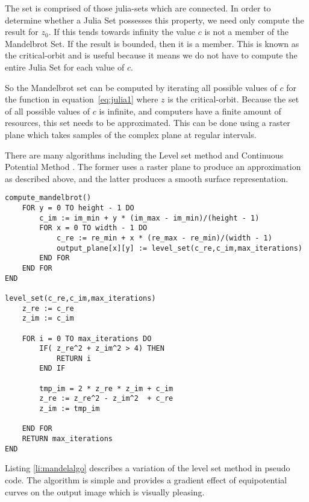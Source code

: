 The set is comprised of those \glspl{julia-set} which are connected. In order to determine whether a Julia Set possesses this property,
we need only compute the result for \(z_0\). If this tends towards infinity the value \(c\) is not a member of the Mandelbrot Set. If the result
is bounded, then it is a member. This is known as the \gls{critical-orbit} and is useful because it means we do not have to compute
the entire Julia Set for each value of \(c\).

So the Mandelbrot set can be computed by iterating all possible values of \(c\) for the function in equation~\ref{eq:julia1} where \(z\) is the 
\gls{critical-orbit}. Because the set of all possible values of \(c\) is infinite, and computers have a finite amount of resources, this 
set needs to be approximated. This can be done using a raster plane which takes samples of the complex plane at regular intervals. 

There are many algorithms including the Level set method \cite[p.~188]{fractimg} and Continuous Potential Method \cite[p.~191]{fractimg}.
The former uses a raster plane to produce an approximation as described above, and the latter produces a smooth surface representation.
\\

\begin{lstlisting}[label = li:mandelalgo, caption = A sequential algorithm to compute the Mandelbrot Set]
compute_mandelbrot()
    FOR y = 0 TO height - 1 DO
        c_im := im_min + y * (im_max - im_min)/(height - 1)
        FOR x = 0 TO width - 1 DO
            c_re := re_min + x * (re_max - re_min)/(width - 1)
            output_plane[x][y] := level_set(c_re,c_im,max_iterations)
        END FOR
    END FOR
END

level_set(c_re,c_im,max_iterations)
    z_re := c_re
    z_im := c_im

    FOR i = 0 TO max_iterations DO
        IF( z_re^2 + z_im^2 > 4) THEN
            RETURN i
        END IF
        
        tmp_im = 2 * z_re * z_im + c_im
        z_re := z_re^2 - z_im^2  + c_re
        z_im := tmp_im
        
    END FOR
    RETURN max_iterations
END
\end{lstlisting}

Listing \ref{li:mandelalgo} describes a variation of the level set method in pseudo code. 
The algorithm is simple and provides a gradient effect of equipotential curves on the output image
which is visually pleasing.

